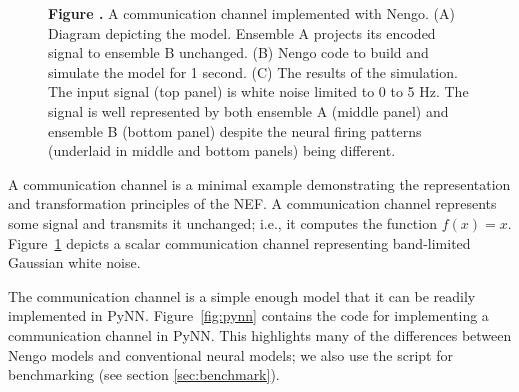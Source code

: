 \documentclass{frontiersSCNS}
\begin{document}
\begin{figure}
\begin{center}
\begin{minipage}{0.39\textwidth}
  \end{minipage}
\end{center}
 \textbf{\label{fig:comm-channel}
   Figure .}{
   A communication channel implemented with Nengo.
   (A) Diagram depicting the model. Ensemble A
   projects its encoded signal to ensemble B unchanged.
   (B) Nengo code to build and simulate the model
   for 1 second.
   (C) The results of the simulation.
   The input signal (top panel) is white noise limited to 0 to 5 Hz.
   The signal is well represented by both ensemble A (middle panel)
   and ensemble B (bottom panel) despite the neural firing patterns
   (underlaid in middle and bottom panels) being different.}
\end{figure}

A communication channel
is a minimal example demonstrating
the representation and transformation principles
of the NEF.
A communication channel
represents some signal and transmits it unchanged;
i.e., it computes the function $f(x) = x$.
Figure~\ref{fig:comm-channel}
depicts a scalar communication channel
representing band-limited Gaussian white noise.

The communication channel
is a simple enough model
that it can be readily implemented in PyNN.
Figure~\ref{fig:pynn} contains the code
for implementing a communication channel in PyNN.
This highlights many of the differences
between Nengo models and conventional neural models;
we also use the script for benchmarking
(see section \ref{sec:benchmark}).
\end{document}
